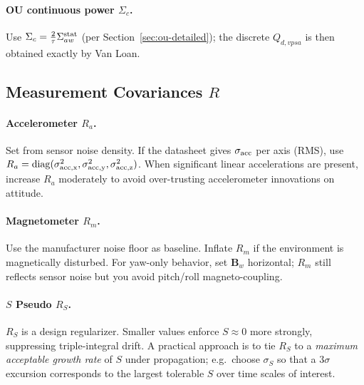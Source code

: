 \documentclass[10pt]{extarticle}
\begin{document}
\paragraph{OU continuous power $\Sigma_c$.}
Use $\Sigma_c=\frac{2}{\tau}\Sigma_{aw}^{\rm stat}$ (per Section~\ref{sec:ou-detailed});
the discrete $Q_{d,vpsa}$ is then obtained exactly by Van Loan.

\subsection{Measurement Covariances $R$}
\paragraph{Accelerometer $R_a$.}
Set from sensor noise density. If the datasheet gives $\sigma_{\rm acc}$ per axis (RMS),
use $R_a=\mathrm{diag}(\sigma_{\rm acc,x}^2,\sigma_{\rm acc,y}^2,\sigma_{\rm acc,z}^2)$.
When significant linear accelerations are present, increase $R_a$ moderately to avoid
over-trusting accelerometer innovations on attitude.

\paragraph{Magnetometer $R_m$.}
Use the manufacturer noise floor as baseline. Inflate $R_m$ if the environment is 
magnetically disturbed. For yaw-only behavior, set $\bm B_w$ horizontal; $R_m$ still
reflects sensor noise but you avoid pitch/roll magneto-coupling.

\paragraph{$S$ Pseudo $R_S$.}
$R_S$ is a design regularizer. Smaller values enforce $S\!\approx 0$ more strongly,
suppressing triple-integral drift. A practical approach is to tie $R_S$ to a
\emph{maximum acceptable growth rate} of $S$ under propagation; e.g.\ choose
$\sigma_{S}$ so that a $3\sigma$ excursion corresponds to the largest tolerable $S$
over time scales of interest.
\end{document}
